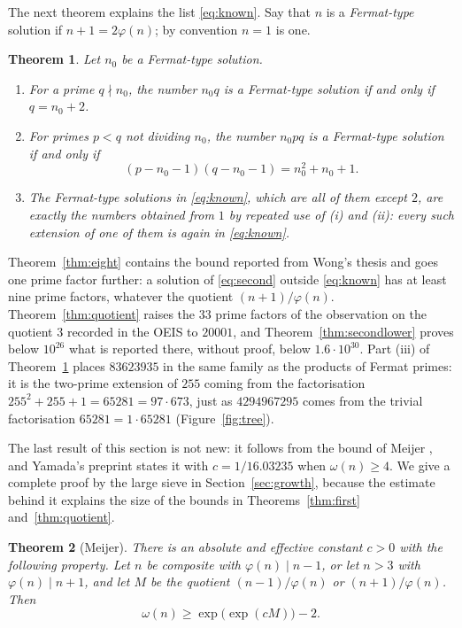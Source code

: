 \documentclass[11pt,reqno]{amsart}
\numberwithin{equation}{section}
\theoremstyle{plain}
\newtheorem{theorem}{Theorem}[section]
\theoremstyle{definition}
\theoremstyle{remark}
\begin{document}
The next theorem explains the list \eqref{eq:known}. Say that $n$ is a
\emph{Fermat-type} solution if $n+1=2\varphi(n)$; by convention $n=1$
is one.

\begin{theorem}\label{thm:ext}
Let $n_0$ be a Fermat-type solution.
\begin{enumerate}[label=\textup{(\roman*)}]
\item For a prime $q\nmid n_0$, the number $n_0q$ is a Fermat-type
  solution if and only if $q=n_0+2$.
\item For primes $p<q$ not dividing $n_0$, the number $n_0pq$ is a
  Fermat-type solution if and only if
  \[
    (p-n_0-1)(q-n_0-1)=n_0^2+n_0+1 .
  \]
\item The Fermat-type solutions in \eqref{eq:known}, which are all
  of them except $2$, are exactly the numbers obtained from $1$ by
  repeated use of \textup{(i)} and \textup{(ii)}: every such extension
  of one of them is again in \eqref{eq:known}.
\end{enumerate}
\end{theorem}

Theorem~\ref{thm:eight} contains the bound reported from Wong's
thesis and goes one prime factor further: a solution of
\eqref{eq:second} outside \eqref{eq:known} has at least nine prime
factors, whatever the quotient $(n+1)/\varphi(n)$. Theorem~\ref{thm:quotient}
raises the $33$ prime factors of the observation on the quotient $3$
recorded in the OEIS to $20001$, and Theorem~\ref{thm:secondlower}
proves below $10^{26}$ what is reported there, without proof, below
$1.6\cdot10^{30}$. Part (iii) of
Theorem~\ref{thm:ext} places $83623935$ in the same family as the
products of Fermat primes: it is the two-prime extension of $255$
coming from the factorisation $255^2+255+1=65281=97\cdot673$, just as
$4294967295$ comes from the trivial factorisation $65281=1\cdot65281$
(Figure~\ref{fig:tree}).

The last result of this section is not new: it follows from the bound
of Meijer \cite{Mei74}, and Yamada's preprint \cite{Yam23} states it
with $c=1/16.03235$ when $\omega(n)\ge4$. We give a complete proof by
the large sieve in Section~\ref{sec:growth}, because the estimate
behind it explains the size of the bounds in Theorems~\ref{thm:first}
and~\ref{thm:quotient}.

\begin{theorem}[Meijer]\label{thm:doubly}
There is an absolute and effective constant $c>0$ with the following
property. Let $n$ be composite with $\varphi(n)\mid n-1$, or let $n>3$
with $\varphi(n)\mid n+1$, and let $M$ be the quotient
$(n-1)/\varphi(n)$ or $(n+1)/\varphi(n)$. Then
\[
  \omega(n)\ge\exp\bigl(\exp(cM)\bigr)-2 .
\]
\end{theorem}
\end{document}

